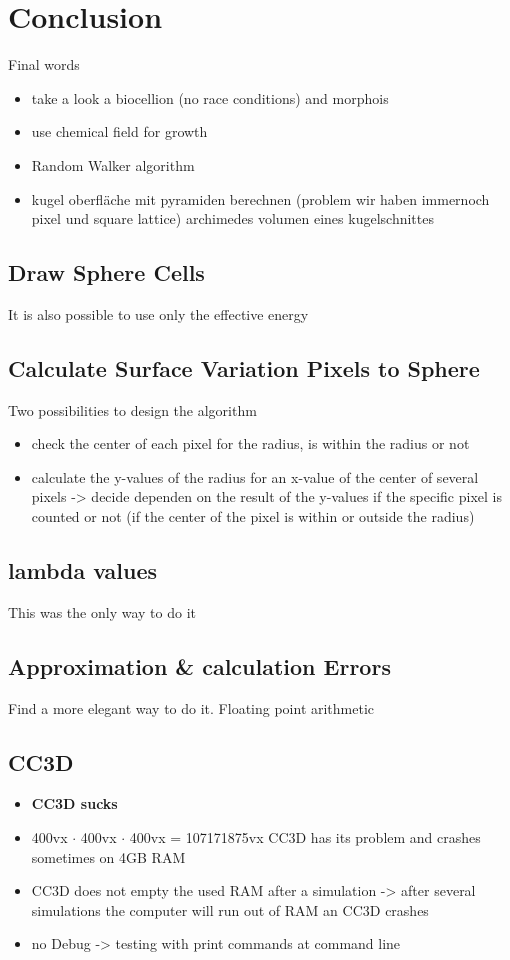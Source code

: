 \chapter{Conclusion}
Final words
\begin{itemize}
\item take a look a biocellion (no race conditions) and morphois
\item use chemical field for growth
\item Random Walker algorithm
\item kugel oberfläche mit pyramiden berechnen (problem wir haben immernoch pixel und square lattice)
\subitem archimedes volumen eines kugelschnittes
\end{itemize}

\section{Draw Sphere Cells}
It is also possible to use only the effective energy

\section{Calculate Surface Variation Pixels to Sphere}
Two possibilities to design the algorithm
\begin{itemize}
\item check the center of each pixel for the radius, is within the radius or not
\item calculate the y-values of the radius for an x-value of the center of several pixels -> decide dependen on the result of the y-values if the specific pixel is counted or not (if the center of the pixel is within or outside the radius)
\end{itemize}
\section{lambda values}
This was the only way to do it

\section{Approximation \& calculation Errors}
Find a more elegant way to do it. \newline
Floating point arithmetic

\section{CC3D}
\begin{itemize}
\item \textbf{CC3D sucks}
\item 400vx $\cdot$ 400vx $\cdot$ 400vx = 107171875vx CC3D has its problem and crashes sometimes on 4GB RAM
\item CC3D does not empty the used RAM after a simulation -> after several simulations the computer will run out of RAM an CC3D crashes
\item no Debug -> testing with print commands at command line
\end{itemize}